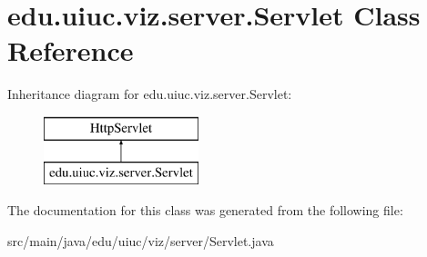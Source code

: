 \hypertarget{classedu_1_1uiuc_1_1viz_1_1server_1_1_servlet}{}\section{edu.\+uiuc.\+viz.\+server.\+Servlet Class Reference}
\label{classedu_1_1uiuc_1_1viz_1_1server_1_1_servlet}
Inheritance diagram for edu.\+uiuc.\+viz.\+server.\+Servlet\+:\begin{figure}[H]
\begin{center}
\leavevmode
\includegraphics[height=2.000000cm]{classedu_1_1uiuc_1_1viz_1_1server_1_1_servlet}
\end{center}
\end{figure}


The documentation for this class was generated from the following file\+:\begin{DoxyCompactItemize}
\item 
src/main/java/edu/uiuc/viz/server/Servlet.\+java\end{DoxyCompactItemize}
